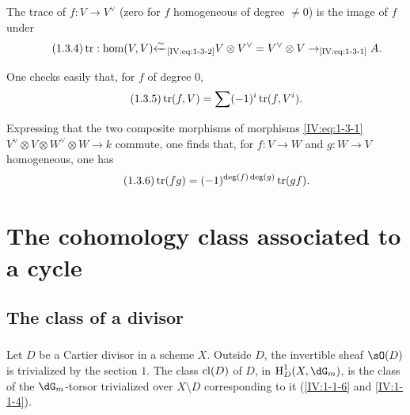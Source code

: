 The trace of $f:V\to V^\vee$ (zero for $f$ homogeneous of degree $\ne 0$) is
the image of $f$ under
\begin{equation*}\tag{1.3.4}\label{IV:eq:1-3-4}
  \operatorname{tr}:\hom(V,V) {\xleftarrow\sim}_\text{\eqref{IV:eq:1-3-2}} V\otimes V^\vee = V^\vee \otimes V \to_\text{\eqref{IV:eq:1-3-1}} A .
\end{equation*}

One checks easily that, for $f$ of degree $0$,
\begin{equation*}\tag{1.3.5}\label{IV:eq:1-3-5}
  \operatorname{tr}(f,V) = \sum (-1)^i \operatorname{tr}(f,V^i) \text{.}
\end{equation*}

Expressing that the two composite morphisms of morphisms
\eqref{IV:eq:1-3-1} $V^\vee\otimes V\otimes W^\vee\otimes W\to k$ commute, one
finds that, for $f:V\to W$ and $g:W\to V$ homogeneous, one has
\begin{equation*}\tag{1.3.6}\label{IV:eq:1-3-6}
  \operatorname{tr}(f g) = (-1)^{\deg(f)\deg(g)} \operatorname{tr}(g f) \text{.}
\end{equation*}


















\section{The cohomology class associated to a cycle}\label{IV:2}









\subsection{The class of a divisor}\label{IV:2-1}




\subsubsection{}\label{IV:2-1-1}

Let $D$ be a Cartier divisor in a scheme $X$. Outside $D$, the invertible
sheaf $\sO(D)$ is trivialized by the section $1$. The class
$\operatorname{cl}(D)$ of $D$, in $\h_D^1(X,\dG_m)$, is the class of the
$\dG_m$-torsor trivialized over $X\setminus D$ corresponding to it
(\ref{IV:1-1-6} and \ref{IV:1-1-4}).

